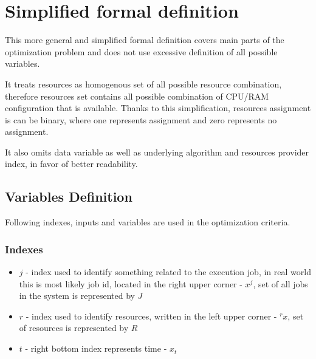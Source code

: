 
\section{Simplified formal definition}\label{sec:formal-definition-simplified}
This more general and simplified formal definition covers main parts of the optimization problem 
and does not use excessive definition of all possible variables.

It treats resources as homogenous set of all possible resource combination,
therefore resources set contains all possible combination of CPU/RAM configuration that is available.
Thanks to this simplification, resources assignment is can be binary,
where one represents assignment and zero represents no assignment.

It also omits data variable as well as underlying algorithm and resources provider index, 
in favor of better readability.


\subsection{Variables Definition}\label{subsec:variables-definition}
Following indexes, inputs and variables are used in the optimization criteria.

\subsubsection{Indexes}
\begin{itemize}
	\item $j$ - index used to identify something related to the execution job,
	      in real world this is most likely job id, located in the right upper corner - $x^{j}$, 
	      set of all jobs in the system is represented by $J$
	\item $r$ - index used to identify resources, written in the left upper corner - ${}^{r}x$, set of resources is represented by $R$
	\item $t$ - right bottom index represents time - $x_t$
\end{itemize}

